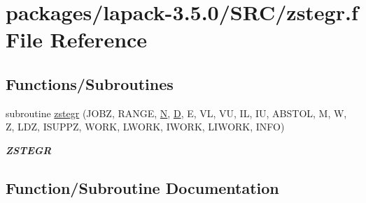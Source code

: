 \hypertarget{zstegr_8f}{}\section{packages/lapack-\/3.5.0/\+S\+R\+C/zstegr.f File Reference}
\label{zstegr_8f}
\subsection*{Functions/\+Subroutines}
\begin{DoxyCompactItemize}
\item 
subroutine \hyperlink{zstegr_8f_a7827e0002f9668e3f3a0049e66c96ef0}{zstegr} (J\+O\+B\+Z, R\+A\+N\+G\+E, \hyperlink{polmisc_8c_a0240ac851181b84ac374872dc5434ee4}{N}, \hyperlink{odrpack_8h_a7dae6ea403d00f3687f24a874e67d139}{D}, E, V\+L, V\+U, I\+L, I\+U, A\+B\+S\+T\+O\+L, M, W, Z, L\+D\+Z, I\+S\+U\+P\+P\+Z, W\+O\+R\+K, L\+W\+O\+R\+K, I\+W\+O\+R\+K, L\+I\+W\+O\+R\+K, I\+N\+F\+O)
\begin{DoxyCompactList}\small\item\em {\bfseries Z\+S\+T\+E\+G\+R} \end{DoxyCompactList}\end{DoxyCompactItemize}


\subsection{Function/\+Subroutine Documentation}
\hypertarget{zstegr_8f_a7827e0002f9668e3f3a0049e66c96ef0}{}
